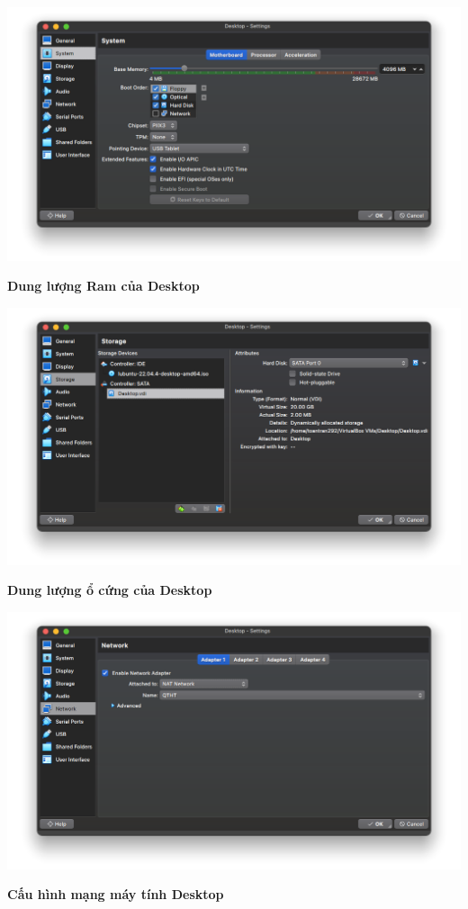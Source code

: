 \begin{minipage}{.93\linewidth}
  \captionsetup{type=figure, skip=-15pt}
  \includegraphics[width=\linewidth]{./imgs/Hinh-8.png}
  \caption{\bfseries Dung lượng Ram của Desktop}
  \label{fig:desktop-ram}
\end{minipage}


\begin{minipage}{.93\linewidth}
  \captionsetup{type=figure, skip=-15pt}
  \includegraphics[width=\linewidth]{./imgs/Hinh-10.png}
  \caption{\bfseries Dung lượng ổ cứng của Desktop}
  \label{fig:desktop-disk}
\end{minipage}


\begin{minipage}{.93\linewidth}
  \captionsetup{type=figure, skip=-15pt}
  \includegraphics[width=\linewidth]{./imgs/Hinh-11.png}
  \caption{\bfseries Cấu hình mạng máy tính Desktop}
  \label{fig:desktop-network-1}
\end{minipage}

